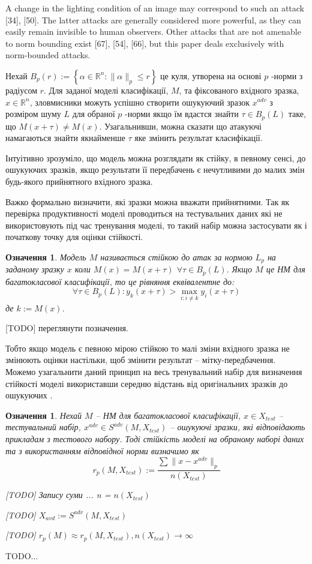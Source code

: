 \documentclass[14pt,a4paper]{extarticle}
\newcounter{e}
\newtheorem{defn}[theorem]{Означення}
\numberwithin{equation}{section}
\numberwithin{figure}{section}
\begin{document}
 
 A change in the lighting condition of an image may correspond to such an attack [34], [50]. The latter attacks are generally considered more powerful, as they can easily remain invisible to human observers. Other attacks that are not amenable to norm bounding exist [67], [54], [66], but this paper deals exclusively with norm-bounded attacks.
 
 
 Нехай $B_{p}(r):=\left\{\alpha \in \mathbb{R}^{n}:\|\alpha\|_{p} \leq r\right\}$ це куля, утворена на основі $p$ -норми
 з радіусом $r$. Для заданої моделі класифікації, $M$, та фіксованого вхідного зразка, $x \in \mathbb{R}^{n}$, зловмисники можуть успішно створити ошукуючий зразок $x^{adv}$ з розміром шуму $L$ для обраної $p$ -норми якщо їм вдастся знайти $\tau \in B_{p}(L)$ таке, що $M(x+\tau) \neq M(x)$. Узагальнивши, можна сказати що атакуючі намагаються знайти якнайменше $\tau$ яке змінить результат класифікації.
 
 Інтуітивно зрозуміло, що модель можна розглядати як стійку, в певному сенсі,
 до ошукуючих зразків, якщо результати її передбачень є нечутливими до малих змін будь-якого прийнятного вхідного зразка.
 
 Важко формально визначити, які зразки можна вважати прийнятними. Так як перевірка продуктивності моделі проводиться на тестувальних даних які не використовують під час тренування моделі, то такий набір можна застосувати як і початкову точку для оцінки стійкості.
 
 \begin{defn}
 Модель $M$ називається стійкою до атак за нормою $L_p$ на заданому зразку $x$ коли $M(x)=M(x+\tau)$ $\forall \tau \in B_{p}(L) .$ Якщо $M$ це НМ для багатокласової класифікації, то це рівняння еквівалентне до:
 $$
 \forall \tau \in B_{p}(L): y_{k}(x+\tau)>\max _{i: i \neq k} y_{i}(x+\tau)
 $$
 де $k:=M(x)$.
 \end{defn}
 [TODO] переглянути позначення.
 
 Тобто якщо модель є певною мірою стійкою то малі зміни вхідного зразка не змінюють оцінки настільки, щоб змінити результат -- мітку-передбачення. Можемо узагальнити даний принцип на весь тренувальний набір для визначення стійкості моделі використавши середню відстань від оригінальних зразків до ошукуючих .
 
 \begin{defn}
 Нехай $M$ -- НМ для багатокласової класифікації, $x \in X_{test}$ -- тестувальний набір, $x^{adv} \in S^{adv}(M, X_{test})$ -- ошукуючі зразки, які відповідають прикладам з тестового набору. Тоді стійкість моделі на обраному наборі даних та з використанням відповідної норми визначимо як
 $$
 r_p(M, X_{test}) := \frac{\sum\|x-x^{adv}\|_{p}}{n(X_{test})}
 $$
 
 [TODO] Запису суми ... n = $n(X_{test})$
 
 [TODO] $X_{avd} := S^{adv}(M, X_{test})$
 
 [TODO] $r_p(M) \approx r_p(M, X_{test}), n(X_{test}) \to \infty$
 
 \end{defn}
 TODO...
 
\end{document}
